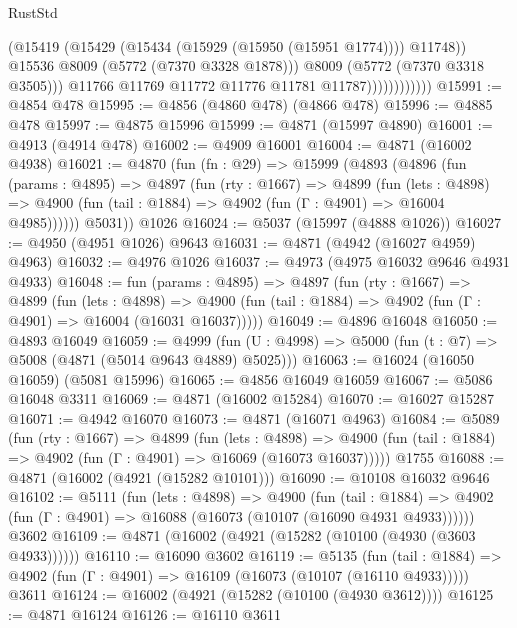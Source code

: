 \begin{lexlean}{RustStd}
\begin{coremodule}
{\begin{coremodule}
{{{{{{{{{{{{{{{{{{{{{{{{{{{{{                                (@15419 (@15429 (@15434 (@15929 (@15950 (@15951 @1774)))) @11748))
                                @15536
                                @8009
                                (@5772 (@7370 @3328 @1878)))
                              @8009
                              (@5772 (@7370 @3318 @3505)))
                            @11766
                            @11769
                            @11772
                            @11776
                            @11781
                            @11787))))))))))))
@15991 := @4854 @478
@15995 := @4856 (@4860 @478) (@4866 @478)
@15996 := @4885 @478
@15997 := @4875 @15996
@15999 := @4871 (@15997 @4890)
@16001 := @4913 (@4914 @478)
@16002 := @4909 @16001
@16004 := @4871 (@16002 @4938)
@16021 := @4870
    (fun (fn : @29) =>
    @15999
      (@4893
        (@4896
          (fun (params : @4895) =>
          @4897
            (fun (rty : @1667) =>
            @4899
              (fun (lets : @4898) =>
              @4900 (fun (tail : @1884) => @4902 (fun (Γ : @4901) => @16004 @4985))))))
        @5031))
    @1026
@16024 := @5037 (@15997 (@4888 @1026))
@16027 := @4950 (@4951 @1026) @9643
@16031 := @4871 (@4942 (@16027 @4959) @4963)
@16032 := @4976 @1026
@16037 := @4973 (@4975 @16032 @9646 @4931 @4933)
@16048 := fun (params : @4895) =>
  @4897
    (fun (rty : @1667) =>
    @4899
      (fun (lets : @4898) =>
      @4900 (fun (tail : @1884) => @4902 (fun (Γ : @4901) => @16004 (@16031 @16037)))))
@16049 := @4896 @16048
@16050 := @4893 @16049
@16059 := @4999 (fun (U : @4998) => @5000 (fun (t : @7) => @5008 (@4871 (@5014 @9643 @4889) @5025)))
@16063 := @16024 (@16050 @16059) (@5081 @15996)
@16065 := @4856 @16049 @16059
@16067 := @5086 @16048 @3311
@16069 := @4871 (@16002 @15284)
@16070 := @16027 @15287
@16071 := @4942 @16070
@16073 := @4871 (@16071 @4963)
@16084 := @5089
    (fun (rty : @1667) =>
    @4899
      (fun (lets : @4898) =>
      @4900 (fun (tail : @1884) => @4902 (fun (Γ : @4901) => @16069 (@16073 @16037)))))
    @1755
@16088 := @4871 (@16002 (@4921 (@15282 @10101)))
@16090 := @10108 @16032 @9646
@16102 := @5111
    (fun (lets : @4898) =>
    @4900
      (fun (tail : @1884) =>
      @4902 (fun (Γ : @4901) => @16088 (@16073 (@10107 (@16090 @4931 @4933))))))
    @3602
@16109 := @4871 (@16002 (@4921 (@15282 (@10100 (@4930 (@3603 @4933))))))
@16110 := @16090 @3602
@16119 := @5135
    (fun (tail : @1884) => @4902 (fun (Γ : @4901) => @16109 (@16073 (@10107 (@16110 @4933)))))
    @3611
@16124 := @16002 (@4921 (@15282 (@10100 (@4930 @3612))))
@16125 := @4871 @16124
@16126 := @16110 @3611
}}}}}}}}}}}}}}}}}}}}}}}}}}}}}
\end{coremodule}}
\end{coremodule}
\end{lexlean}
